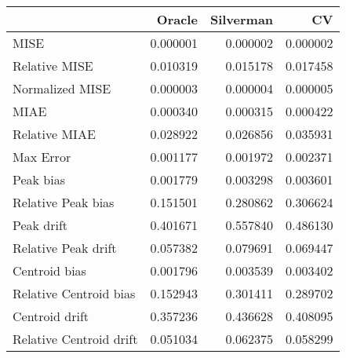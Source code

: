 \begin{tabular}{lrrr}
  \hline
 & Oracle & Silverman & CV \\ 
  \hline
MISE & 0.000001 & 0.000002 & 0.000002 \\ 
  Relative MISE & 0.010319 & 0.015178 & 0.017458 \\ 
  Normalized MISE & 0.000003 & 0.000004 & 0.000005 \\ 
  MIAE & 0.000340 & 0.000315 & 0.000422 \\ 
  Relative MIAE & 0.028922 & 0.026856 & 0.035931 \\ 
  Max Error & 0.001177 & 0.001972 & 0.002371 \\ 
  Peak bias & 0.001779 & 0.003298 & 0.003601 \\ 
  Relative Peak bias & 0.151501 & 0.280862 & 0.306624 \\ 
  Peak drift & 0.401671 & 0.557840 & 0.486130 \\ 
  Relative Peak drift & 0.057382 & 0.079691 & 0.069447 \\ 
  Centroid bias & 0.001796 & 0.003539 & 0.003402 \\ 
  Relative Centroid bias & 0.152943 & 0.301411 & 0.289702 \\ 
  Centroid drift & 0.357236 & 0.436628 & 0.408095 \\ 
  Relative Centroid drift & 0.051034 & 0.062375 & 0.058299 \\ 
   \hline
\end{tabular}
